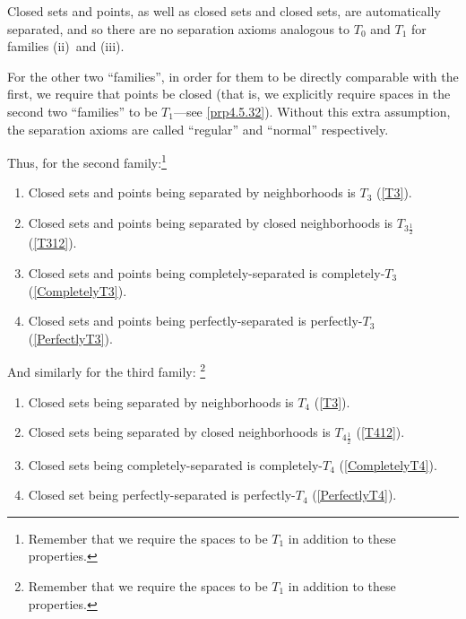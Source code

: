 Closed sets and points, as well as closed sets and closed sets, are automatically separated, and so there are no separation axioms analogous to $T_0$ and $T_1$ for families (ii)~and (iii).

For the other two ``families'', in order for them to be directly comparable with the first, we require that points be closed (that is, we explicitly require spaces in the second two ``families'' to be $T_1$---see \cref{prp4.5.32}).  Without this extra assumption, the separation axioms are called ``regular'' and ``normal'' respectively.

Thus, for the second family:\footnote{Remember that we require the spaces to be $T_1$ in addition to these properties.}
\begin{enumerate}
\item Closed sets and points being separated by neighborhoods is $T_3$ (\cref{T3}).
\item Closed sets and points being separated by closed neighborhoods is $T_{3\frac{1}{2}}$ (\cref{T312}).
\item Closed sets and points being completely-separated is completely-$T_3$ (\cref{CompletelyT3}).
\item Closed sets and points being perfectly-separated is perfectly-$T_3$ (\cref{PerfectlyT3}).
\end{enumerate}

And similarly for the third family:
\footnote{Remember that we require the spaces to be $T_1$ in addition to these properties.}
\begin{enumerate}
\item Closed sets being separated by neighborhoods is $T_4$ (\cref{T3}).
\item Closed sets being separated by closed neighborhoods is $T_{4\frac{1}{2}}$ (\cref{T412}).
\item Closed sets being completely-separated is completely-$T_4$ (\cref{CompletelyT4}).
\item Closed set being perfectly-separated is perfectly-$T_4$ (\cref{PerfectlyT4}).
\end{enumerate}

